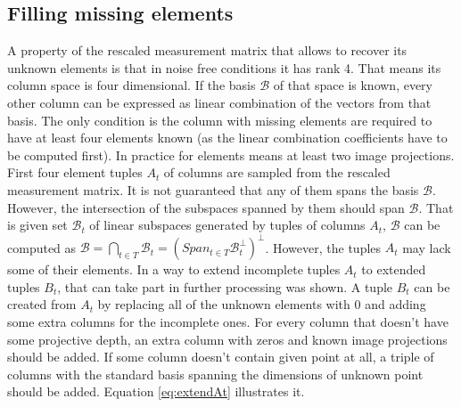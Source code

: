\documentclass[12pt]{article}
\begin{document}
\subsection{Filling missing elements}

A property of the rescaled measurement matrix that allows to recover its unknown elements is that in noise free conditions it has rank 4. That means its column space is four dimensional. If the basis $\mathcal{B}$ of that space is known, every other column can be expressed as linear combination of the vectors from that basis. The only condition is the column with missing elements are required to have at least four elements known (as the linear combination coefficients have to be computed first). In practice for elements means at least two image projections.
First four element tuples $A_t$ of columns are sampled from the rescaled measurement matrix. It is not guaranteed that any of them spans the basis $\mathcal{B}$. However, the intersection of the subspaces spanned by them should span $\mathcal{B}$. That is given set $\mathcal{B}_t$ of linear subspaces generated by tuples of columns $A_t$, $\mathcal{B}$ can be computed as $\mathcal{B} = \bigcap_{t \in T} \mathcal{B}_t = (Span_{t \in T} \mathcal{B}_t^\bot)^\bot$. However, the tuples $A_t$ may lack some of their elements.
In \cite{svoboda04} a way to extend incomplete tuples $A_t$ to extended tuples $B_t$, that can take part in further processing was shown. A tuple $B_t$ can be created from $A_t$ by replacing all of the unknown elements with $0$ and adding some extra columns for the incomplete ones. For every column that doesn't have some projective depth, an extra column with zeros and known image projections should be added. If some column doesn't contain given point at all, a triple of columns with the standard basis spanning the dimensions of unknown point should be added. Equation \ref{eq:extendAt} illustrates it.
\end{document}
